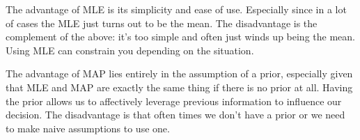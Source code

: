 \documentclass{article}
\begin{document}
The advantage of MLE is its simplicity and ease of use. Especially since in a lot of cases the MLE just turns out to be the mean. The disadvantage is the complement of the above: it's too simple and often just winds up being the mean. Using MLE can constrain you depending on the situation.

The advantage of MAP lies entirely in the assumption of a prior, especially given that MLE and MAP are exactly the same thing if there is no prior at all. Having the prior allows us to affectively leverage previous information to influence our decision. The disadvantage is that often times we don't have a prior or we need to make naive assumptions to use one.
\end{document}
